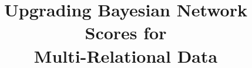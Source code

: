 \documentclass[letterpaper]{article}
\begin{document}
\title{Upgrading Bayesian Network Scores for \\Multi-Relational Data}

\author{
}

\maketitle

%




%
%


%
%

\end{document}

